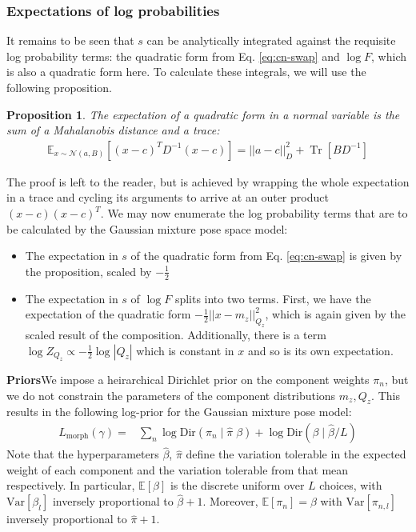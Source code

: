 \documentclass{article}         %
\newtheorem{proposition}{Proposition}[section]
\newcommand{\inv}{^{-1}}
\newcommand{\EE}{\mathbb{E}}
\newcommand{\NN}{\mathcal{N}}
\newcommand{\abs}[1]{\left| #1 \right|}
\newcommand{\norm}[1]{\left|\left| #1 \right|\right|}
\newcommand{\bc}[1]{\left[ #1 \right]}
\DeclareMathOperator{\Tr}{Tr}
\begin{document}
\subsubsection{Expectations of log probabilities}

It remains to be seen that $s$ can be analytically integrated against the requisite log probability terms: the quadratic form from Eq. \ref{eq:cn-swap} and $\log F$, which is also a quadratic form here. To calculate these integrals, we will use the following proposition.
\begin{proposition}
\label{prop:norm-quad-expect-2}
The expectation of a quadratic form in a normal variable is the sum of a Mahalanobis distance and a trace:
\begin{align}
    \EE_{x\sim\NN(a, B)} \bc{(x - c)^T D\inv (x - c)} = \norm{a - c}^2_D + \Tr\bc{BD\inv}
\end{align}
\end{proposition}
The proof is left to the reader, but is achieved by wrapping the whole expectation in a trace and cycling its arguments to arrive at an outer product $(x - c)(x - c)^T$. We may now enumerate the log probability terms that are to be calculated by the Gaussian mixture pose space model:
\begin{itemize}
    \item The expectation in $s$ of the quadratic form from Eq. \ref{eq:cn-swap} is given by the proposition, scaled by $-\frac{1}{2}$
    \item The expectation in $s$ of $\log F$ splits into two terms. First, we have the expectation of the quadratic form $-\frac{1}{2}\norm{x - m_z}^2_{Q_z}$, which is again given by the scaled result of the composition. Additionally, there is a term $\log Z_{Q_z} \propto -\frac{1}{2}\log\abs{Q_z}$ which is constant in $x$ and so is its own expectation.
\end{itemize}

\textbf{Priors}\quad We impose a heirarchical Dirichlet prior on the component weights $\pi_n$, but we do not constrain the parameters of the component distributions $m_z, Q_z$. This results in the following log-prior for the Gaussian mixture pose model:
\begin{align}
    L_{\text{morph}}(\gamma) =& \sum_n \log\text{Dir}(\pi_n \mid \hat\pi\;\beta) + \log\text{Dir}(\beta\mid \hat\beta / L)
\end{align}
Note that the hyperparameters $\hat\beta$, $\hat\pi$ define the variation tolerable in the expected weight of each component and the variation tolerable from that mean respectively. In particular, $\EE[\beta]$ is the discrete uniform over $L$ choices, with $\text{Var}[\beta_l]$ inversely proportional to $\hat\beta + 1$. Moreover, $\EE[\pi_n] = \beta$ with $\text{Var}[\pi_{n, l}]$ inversely proportional to $\hat\pi + 1$.
\end{document}
